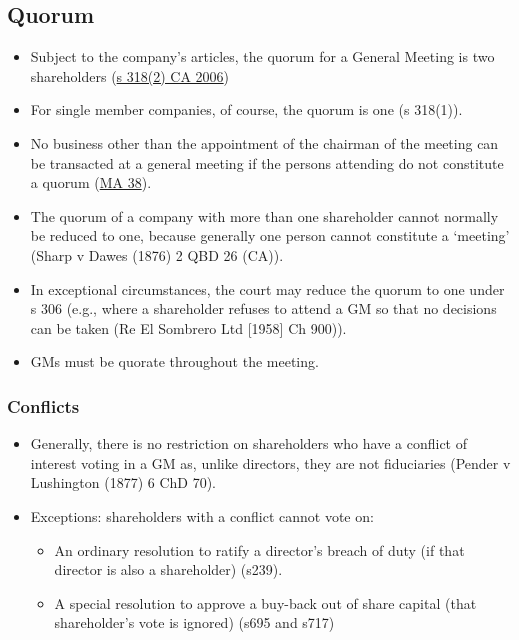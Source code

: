 \documentclass[
]{article}
\providecommand{\tightlist}{%
  \setlength{\itemsep}{0pt}\setlength{\parskip}{0pt}}
\begin{document}
\hypertarget{quorum-1}{%
\subsection{Quorum}\label{quorum-1}}

\begin{itemize}
\tightlist
\item
  Subject to the company's articles, the quorum for a General Meeting is
  two shareholders
  (\href{https://www.legislation.gov.uk/ukpga/2006/46/section/318}{s
  318(2) CA 2006})
\item
  For single member companies, of course, the quorum is one (s 318(1)).
\item
  No business other than the appointment of the chairman of the meeting
  can be transacted at a general meeting if the persons attending do not
  constitute a quorum
  (\href{https://www.gov.uk/government/publications/model-articles-for-private-companies-limited-by-shares/model-articles-for-private-companies-limited-by-shares\#quorumgen}{MA
  38}).
\item
  The quorum of a company with more than one shareholder cannot normally
  be reduced to one, because generally one person cannot constitute a
  `meeting' (Sharp v Dawes (1876) 2 QBD 26 (CA)).
\item
  In exceptional circumstances, the court may reduce the quorum to one
  under s 306 (e.g., where a shareholder refuses to attend a GM so that
  no decisions can be taken (Re El Sombrero Ltd {[}1958{]} Ch 900)).
\item
  GMs must be quorate throughout the meeting.
\end{itemize}

\hypertarget{conflicts}{%
\subsubsection{Conflicts}\label{conflicts}}

\begin{itemize}
\tightlist
\item
  Generally, there is no restriction on shareholders who have a conflict
  of interest voting in a GM as, unlike directors, they are not
  fiduciaries (Pender v Lushington (1877) 6 ChD 70).
\item
  Exceptions: shareholders with a conflict cannot vote on:

  \begin{itemize}
  \tightlist
  \item
    An ordinary resolution to ratify a director's breach of duty (if
    that director is also a shareholder) (s239).
  \item
    A special resolution to approve a buy-back out of share capital
    (that shareholder's vote is ignored) (s695 and s717)
  \end{itemize}
\end{itemize}
\end{document}

